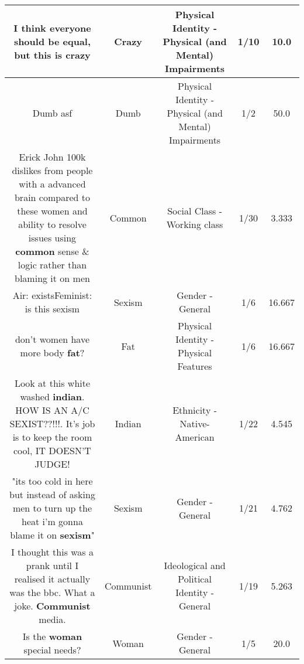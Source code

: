 \documentclass[11pt]{article}
\newlength\mylength
\begin{document}
\begin{center}
\begin{longtable}{|C{.65\mylength}|C{.30\mylength}|C{.12\mylength}|C{.12\mylength}|C{.12\mylength}|}
  \small I think everyone should be equal, but this is crazy\normalsize   & Crazy & Physical Identity - Physical (and Mental) Impairments & 1/10 & 10.0 \\  \hline
  \small Dumb asf\normalsize   & Dumb & Physical Identity - Physical (and Mental) Impairments & 1/2 & 50.0 \\  \hline
  \small Erick John 100k dislikes from people with a advanced brain compared to these women and ability to resolve issues using \textbf{common} sense \& logic rather than blaming it on men\normalsize   & Common & Social Class - Working class & 1/30 & 3.333 \\  \hline
  \small Air: existsFeminist: is this sexism\normalsize   & Sexism & Gender - General & 1/6 & 16.667 \\  \hline
  \small don't women have more body \textbf{fat}?\normalsize   & Fat & Physical Identity - Physical Features & 1/6 & 16.667 \\  \hline
  \small Look at this white washed \textbf{indian}. HOW IS AN A/C SEXIST??!!!. It's job is to keep the room cool, IT DOESN'T JUDGE!\normalsize   & Indian & Ethnicity - Native-American & 1/22 & 4.545 \\  \hline
  \small "its too cold in here but instead of asking men to turn up the heat i'm gonna blame it on \textbf{sexism}"\normalsize   & Sexism & Gender - General & 1/21 & 4.762 \\  \hline
  \small I thought this was a prank until I realised it actually was the bbc. What a joke. \textbf{Communist} media.\normalsize   & Communist &  Ideological and Political Identity - General & 1/19 & 5.263 \\  \hline
  \small Is the \textbf{woman} special needs?\normalsize   & Woman & Gender - General & 1/5 & 20.0 \\  \hline

\end{longtable}
\end{center}
\end{document}
